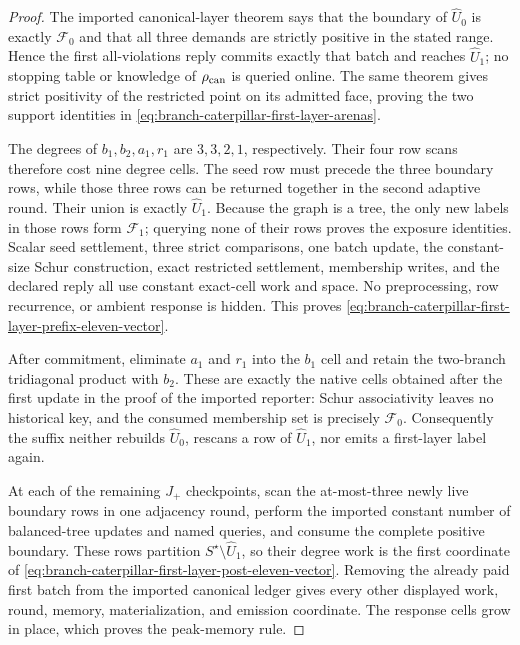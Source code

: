 \begin{proof}
The imported canonical-layer theorem says that the boundary of
$\widehat U_0$ is exactly $\mathcal F_0$ and that all three demands are
strictly positive in the stated range.  Hence the first all-violations reply
commits exactly that batch and reaches $\widehat U_1$; no stopping table or
knowledge of $\rho_{\rm can}$ is queried online.  The same theorem gives
strict positivity of the restricted point on its admitted face, proving the
two support identities in
\cref{eq:branch-caterpillar-first-layer-arenas}.

The degrees of $b_1,b_2,a_1,r_1$ are $3,3,2,1$, respectively.  Their four
row scans therefore cost nine degree cells.  The seed row must precede the
three boundary rows, while those three rows can be returned together in the
second adaptive round.  Their union is exactly $\widehat U_1$.  Because the
graph is a tree, the only new labels in those rows form $\mathcal F_1$;
querying none of their rows proves the exposure identities.  Scalar seed
settlement, three strict comparisons, one batch update, the constant-size
Schur construction, exact restricted settlement, membership writes, and the
declared reply all use constant exact-cell work and space.  No preprocessing,
row recurrence, or ambient response is hidden.  This proves
\cref{eq:branch-caterpillar-first-layer-prefix-eleven-vector}.

After commitment, eliminate $a_1$ and $r_1$ into the $b_1$ cell and retain
the two-branch tridiagonal product with $b_2$.  These are exactly the native
cells obtained after the first update in the proof of the imported reporter:
Schur associativity leaves no historical key, and the consumed membership
set is precisely $\mathcal F_0$.  Consequently the suffix neither rebuilds
$\widehat U_0$, rescans a row of $\widehat U_1$, nor emits a first-layer label
again.

At each of the remaining $J_+$ checkpoints, scan the at-most-three newly live
boundary rows in one adjacency round, perform the imported constant number of
balanced-tree updates and named queries, and consume the complete positive
boundary.  These rows partition $S^\star\setminus\widehat U_1$, so their
degree work is the first coordinate of
\cref{eq:branch-caterpillar-first-layer-post-eleven-vector}.  Removing the
already paid first batch from the imported canonical ledger gives every other
displayed work, round, memory, materialization, and emission coordinate.
The response cells grow in place, which proves the peak-memory rule.
\end{proof}

